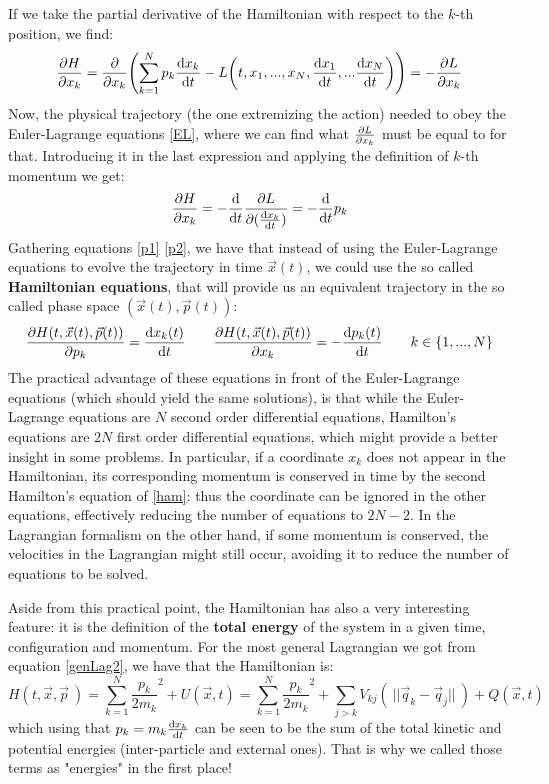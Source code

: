\documentclass[11pt, a4paper]{article} %
\begin{document}
If we take the partial derivative of the Hamiltonian with respect to the $k$-th position, we find:
\begin{equation}
\pdv{H}{x_k}=\pdv{}{x_k}\qty(\sum_{k=1}^N p_k \dv{x_k}{t} (p_k)-L\qty(t, x_1,...,x_N, \dv{x_1}{t} (p_1),... \dv{x_N}{t} (p_N)))=-\pdv{L}{x_k}
\end{equation}
Now, the physical trajectory (the one extremizing the action) needed to obey the Euler-Lagrange equations \eqref{EL}, where we can find what $\pdv{L}{x_k}$ must be equal to for that. Introducing it in the last expression and applying the definition of $k$-th momentum we get:
\begin{equation}\label{p2}
\pdv{H}{x_k}=-\dv{}{t}\pdv{L}{(\dv{x_k}{t})}=-\dv{}{t}p_k
\end{equation}
Gathering equations \eqref{p1} \eqref{p2}, we have that instead of using the Euler-Lagrange equations to evolve the trajectory in time $\vec{x}(t)$, we could use the so called {\bf Hamiltonian equations}, that will provide us an equivalent trajectory in the so called phase space $(\vec{x}(t), \vec{p}(t))$:
\begin{equation}\label{ham}
\pdv{H(t,\vec{x}(t),\vec{p}(t))}{p_k}=\dv{x_k(t)}{t}\quad\quad \pdv{H(t,\vec{x}(t),\vec{p}(t))}{x_k}=-\dv{p_k(t)}{t}\quad \quad k\in\{1,...,N\}
\end{equation}
The practical advantage of these equations in front of the Euler-Lagrange equations (which should yield the same solutions), is that while the Euler-Lagrange equations are $N$ second order differential equations, Hamilton's equations are $2N$ first order differential equations, which might provide a better insight in some problems. In particular, if a coordinate $x_k$ does not appear in the Hamiltonian, its corresponding momentum is conserved in time by the second Hamilton's equation of \eqref{ham}: thus the coordinate can be ignored in the other equations, effectively reducing the number of equations to $2N-2$. In the Lagrangian formalism on the other hand, if some momentum is conserved, the velocities in the Lagrangian might still occur, avoiding it to reduce the number of equations to be solved.

Aside from this practical point, the Hamiltonian has also a very interesting feature: it is the definition of the {\bf total energy} of the system in a given time, configuration and momentum. For the most general Lagrangian we got from equation \eqref{genLag2}, we have that the Hamiltonian is:
\begin{equation}\label{HamDef}
H(t, \vec{x},\vec{p}\ )=\sum_{k=1}^N \frac{p_k}{2m_k}^2+U(\vec{x},t)=\sum_{k=1}^N \frac{p_k}{2m_k}^2+\sum_{j>k} V_{kj}(\ ||\vec{q}_k-\vec{q}_j||\ )+Q(\vec{x},t)
\end{equation}
which using that $p_k=m_k\dv{x_k}{t}$ can be seen to be the sum of the total kinetic and potential energies (inter-particle and external ones). That is why we called those terms as "energies" in the first place!
\end{document}

